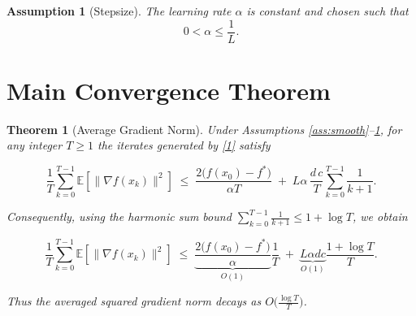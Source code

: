 \documentclass{article}
\newtheorem{theorem}{Theorem}
\newtheorem{assumption}{Assumption}
\newcommand{\E}{\mathbb{E}}
\begin{document}
\begin{assumption}[Stepsize]\label{ass:stepsize}
The learning rate $\alpha$ is constant and chosen such that
\[
0<\alpha\le \frac{1}{L}.
\tag{A4}
\]
\end{assumption}

\section*{Main Convergence Theorem}
\begin{theorem}[Average Gradient Norm]\label{thm:main}
Under Assumptions \ref{ass:smooth}–\ref{ass:stepsize},
for any integer $T\ge1$ the iterates generated by \eqref{1} satisfy  

\[
\frac{1}{T}\sum_{k=0}^{T-1}\E\!\left[\|\nabla f(x_{k})\|^{2}\right]
\;\le\;
\frac{2\bigl(f(x_{0})-f^{*}\bigr)}{\alpha T}
\;+\;
L\alpha\,\frac{d\,c}{T}\sum_{k=0}^{T-1}\frac{1}{k+1}.
\tag{4}
\]

Consequently, using the harmonic sum bound $\sum_{k=0}^{T-1}\frac{1}{k+1}
\le 1+\log T$, we obtain  

\[
\frac{1}{T}\sum_{k=0}^{T-1}\E\!\left[\|\nabla f(x_{k})\|^{2}\right]
\;\le\;
\underbrace{\frac{2\bigl(f(x_{0})-f^{*}\bigr)}{\alpha}}_{\displaystyle O(1)}
\frac{1}{T}
\;+\;
\underbrace{L\alpha d c}_{\displaystyle O(1)}\frac{1+\log T}{T}.
\tag{5}
\]

Thus the averaged squared gradient norm decays as $O\!\bigl(\frac{\log T}{T}\bigr)$.
\end{theorem}

\end{document}
